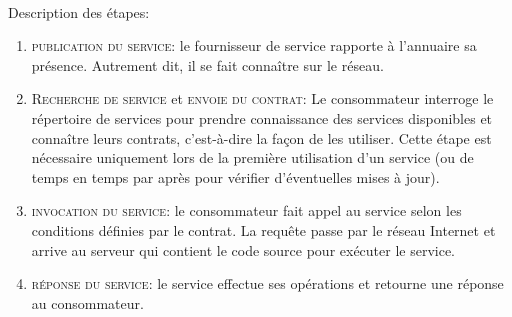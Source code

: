 {\paragraph{}Description des étapes:
\begin{enumerate}
\item \textcolor{ltred}{\textsc{publication du service}}: le fournisseur de service rapporte à l'annuaire sa présence. Autrement dit, il se fait connaître sur le réseau.
\item \textcolor{ltred}{\textsc{Recherche de service}} et \textcolor{ltred}{\textsc{envoie du contrat}}: Le consommateur interroge le répertoire de services pour prendre connaissance des services disponibles et connaître leurs contrats, c'est-à-dire la façon de les utiliser. Cette étape est nécessaire uniquement lors de la première utilisation d'un service (ou de temps en temps par après pour vérifier d'éventuelles mises à jour).
\item \textcolor{ltred}{\textsc{invocation du service}}: le consommateur fait appel au service selon les conditions définies par le contrat. La requête passe par le réseau Internet et arrive au serveur qui contient le code source pour exécuter le service.
\item \textcolor{ltred}{\textsc{réponse du service}}: le service effectue ses opérations et retourne une réponse au consommateur.
\end{enumerate}
}


